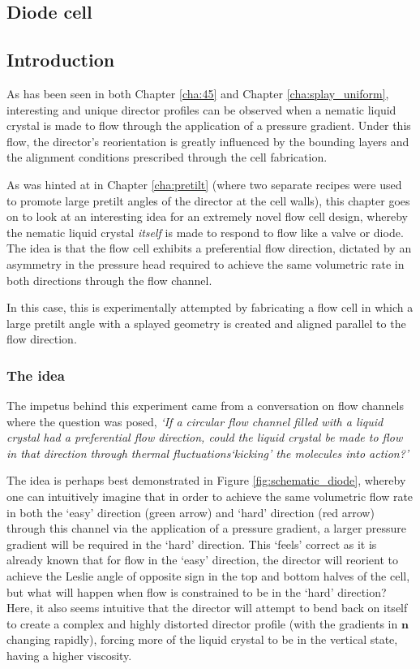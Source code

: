 \subsection{Diode cell}
\label{cha:diode}
\subsection{Introduction}
As has been seen in both Chapter \ref{cha:45} and Chapter \ref{cha:splay_uniform}, interesting and unique director profiles can be observed when a nematic liquid crystal is made to flow through the application of a pressure gradient. Under this flow, the director's reorientation is greatly influenced by the bounding layers and the alignment conditions prescribed through the cell fabrication.

As was hinted at in Chapter \ref{cha:pretilt} (where two separate recipes were used to promote large pretilt angles of the director at the cell walls), this chapter goes on to look at an interesting idea for an extremely novel flow cell design, whereby the nematic liquid crystal \textit{itself} is made to respond to flow like a valve or diode. The idea is that the flow cell exhibits a preferential flow direction, dictated by an asymmetry in the pressure head required to achieve the same volumetric rate in both directions through the flow channel. 

In this case, this is experimentally attempted by fabricating a flow cell in which a large pretilt angle with a splayed geometry is created and aligned parallel to the flow direction.

\subsubsection{The idea}
The impetus behind this experiment came from a conversation on flow channels where the question was posed, \textit{`If a circular flow channel filled with a liquid crystal had a preferential flow direction, could the liquid crystal be made to flow in that direction through thermal fluctuations`kicking' the molecules into action?'}

The idea is perhaps best demonstrated in Figure \ref{fig:schematic_diode}, whereby one can intuitively imagine that in order to achieve the same volumetric flow rate in both the `easy' direction (green arrow) and `hard' direction (red arrow) through this channel via the application of a pressure gradient, a larger pressure gradient will be required in the `hard' direction. This `feels' correct as it is already known that for flow in the `easy' direction, the director will reorient to achieve the Leslie angle of opposite sign in the top and bottom halves of the cell, but what will happen when flow is constrained to be in the `hard' direction? Here, it also seems intuitive that the director will attempt to bend back on itself to create a complex and highly distorted director profile (with the gradients in $\bm{n}$ changing rapidly), forcing more of the liquid crystal to be in the vertical state, having a higher viscosity.

